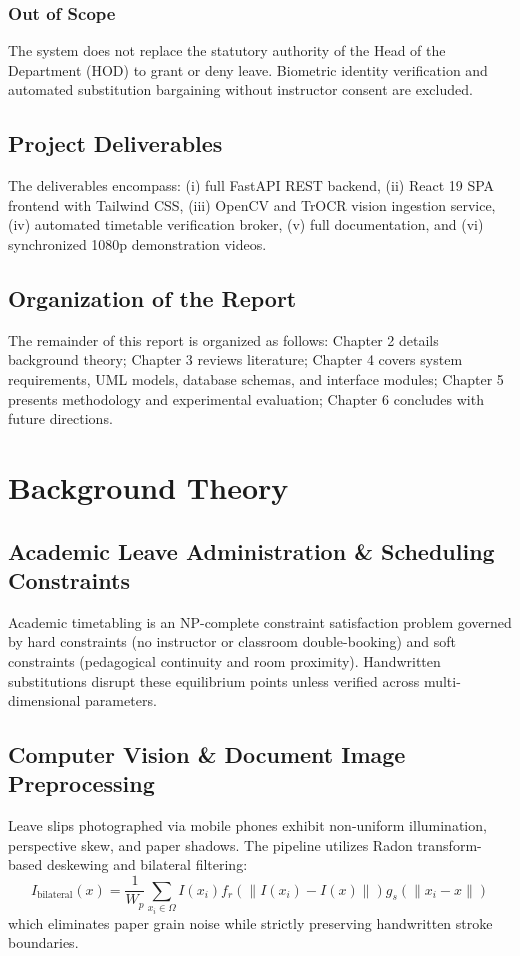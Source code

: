 \documentclass[12pt,letterpaper]{report}
\begin{document}
\subsection{Out of Scope}
The system does not replace the statutory authority of the Head of the Department (HOD) to grant or deny leave. Biometric identity verification and automated substitution bargaining without instructor consent are excluded.

\section{Project Deliverables}
The deliverables encompass: (i) full FastAPI REST backend, (ii) React 19 SPA frontend with Tailwind CSS, (iii) OpenCV and TrOCR vision ingestion service, (iv) automated timetable verification broker, (v) full documentation, and (vi) synchronized 1080p demonstration videos.

\section{Organization of the Report}
The remainder of this report is organized as follows: Chapter 2 details background theory; Chapter 3 reviews literature; Chapter 4 covers system requirements, UML models, database schemas, and interface modules; Chapter 5 presents methodology and experimental evaluation; Chapter 6 concludes with future directions.

\chapter{Background Theory}

\section{Academic Leave Administration \& Scheduling Constraints}
Academic timetabling is an NP-complete constraint satisfaction problem governed by hard constraints (no instructor or classroom double-booking) and soft constraints (pedagogical continuity and room proximity). Handwritten substitutions disrupt these equilibrium points unless verified across multi-dimensional parameters.

\section{Computer Vision \& Document Image Preprocessing}
Leave slips photographed via mobile phones exhibit non-uniform illumination, perspective skew, and paper shadows. The pipeline utilizes Radon transform-based deskewing and bilateral filtering:
\begin{equation}
I_{\text{bilateral}}(x) = \frac{1}{W_p} \sum_{x_i \in \Omega} I(x_i) f_r(\|I(x_i) - I(x)\|) g_s(\|x_i - x\|)
\end{equation}
which eliminates paper grain noise while strictly preserving handwritten stroke boundaries.
\end{document}
